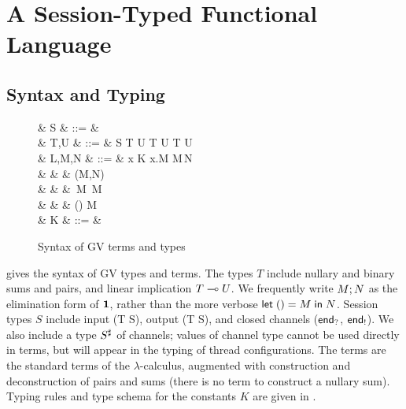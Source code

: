 \documentclass[oribibl,orivec,envcountsame]{llncs}
\begin{document}
\section{A Session-Typed Functional Language}\label{sec:gv}

\subsection{Syntax and Typing}\label{sec:gv-static}

\begin{figure}[float]
\begin{syntax}
   & S & ::= &  \mid {} \mid \interm \mid \outterm \mid {} \\
   & T,U & ::= & S \mid T \gvtimes U \mid \one \mid T \gvplus U \mid \zero \mid T \lto U
  \\ %
   & L,M,N & ::= & x \mid K \mid \lambda x.M \mid M\,N \\
  & & \mid & (M,N) \mid {} \\
  & & \mid & \,M \mid {}\,M \mid {} \\
  & & \mid & () \mid {} \mid {} \app M \\
   & K & ::= &  \mid {} \mid {} \mid {} \mid {}\\
\end{syntax}
\caption{Syntax of GV terms and types}\label{fig:gv-syntax}
\end{figure}

 gives the syntax of GV types and terms.  The types $T$ include nullary and binary
sums and pairs, and linear implication $T \multimap U$.  We frequently write $M; N$ as the
elimination form of $\mathbf{1}$, rather than the more verbose $\mathsf{let}\;() = M\;\mathsf{in}\;N$.  Session types $S$
include input (\gvin T S), output (\gvout T S), and closed channels ($\mathsf{end}_?$, $\mathsf{end}_!$).  We
also include a type $S^\sharp$ of channels; values of channel type cannot be used directly in
terms, but will appear in the typing of thread configurations.  The terms are the standard terms of
the $\lambda$-calculus, augmented with construction and deconstruction of pairs and sums (there is
no term to construct a nullary sum).  Typing rules and type schema for the constants $K$ are given
in .
\end{document}
